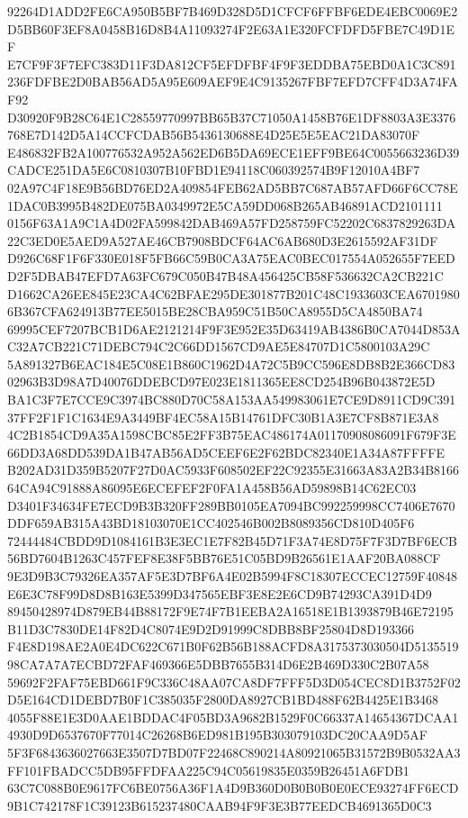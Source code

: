 \documentclass[UTF8,fontset=fandol,zihao=-4,a4paper]{ctexart}
\begin{document}
{{92264D1ADD2FE6CA950B5BF7B469D328D5D1CFCF6FFBF6EDE4EBC0069E2D5BB60F3EF8A0458B16D8B4A11093274F2E63A1E320FCFDFD5FBE7C49D1EF
E7CF9F3F7EFC383D11F3DA812CF5EFDFBF4F9F3EDDBA75EBD0A1C3C891236FDFBE2D0BAB56AD5A95E609AEF9E4C9135267FBF7EFD7CFF4D3A74FAF92
D30920F9B28C64E1C28559770997BB65B37C71050A1458B76E1DF8803A3E3376768E7D142D5A14CCFCDAB56B5436130688E4D25E5E5EAC21DA83070F
E486832FB2A100776532A952A562ED6B5DA69ECE1EFF9BE64C0055663236D39CADCE251DA5E6C0810307B10FBD1E94118C060392574B9F12010A4BF7
02A97C4F18E9B56BD76ED2A409854FEB62AD5BB7C687AB57AFD66F6CC78E1DAC0B3995B482DE075BA0349972E5CA59DD068B265AB46891ACD2101111
0156F63A1A9C1A4D02FA599842DAB469A57FD258759FC52202C6837829263DA22C3ED0E5AED9A527AE46CB7908BDCF64AC6AB680D3E2615592AF31DF
D926C68F1F6F330E018F5FB66C59B0CA3A75EAC0BEC017554A052655F7EEDD2F5DBAB47EFD7A63FC679C050B47B48A456425CB58F536632CA2CB221C
D1662CA26EE845E23CA4C62BFAE295DE301877B201C48C1933603CEA67019806B367CFA624913B77EE5015BE28CBA959C51B50CA8955D5CA4850BA74
69995CEF7207BCB1D6AE2121214F9F3E952E35D63419AB4386B0CA7044D853AC32A7CB221C71DEBC794C2C66DD1567CD9AE5E84707D1C5800103A29C
5A891327B6EAC184E5C08E1B860C1962D4A72C5B9CC596E8DB8B2E366CD8302963B3D98A7D40076DDEBCD97E023E1811365EE8CD254B96B043872E5D
BA1C3F7E7CCE9C3974BC880D70C58A153AA549983061E7CE9D8911CD9C39137FF2F1F1C1634E9A3449BF4EC58A15B14761DFC30B1A3E7CF8B871E3A8
4C2B1854CD9A35A1598CBC85E2FF3B75EAC486174A01170908086091F679F3E66DD3A68DD539DA1B47AB56AD5CEEF6E2F62BDC82340E1A34A87FFFFE
B202AD31D359B5207F27D0AC5933F608502EF22C92355E31663A83A2B34B816664CA94C91888A86095E6ECEFEF2F0FA1A458B56AD59898B14C62EC03
D3401F34634FE7ECD9B3B320FF289BB0105EA7094BC992259998CC7406E7670DDF659AB315A43BD18103070E1CC402546B002B8089356CD810D405F6
72444484CBDD9D1084161B3E3EC1E7F82B45D71F3A74E8D75F7F3D7BF6ECB56BD7604B1263C457FEF8E38F5BB76E51C05BD9B26561E1AAF20BA088CF
9E3D9B3C79326EA357AF5E3D7BF6A4E02B5994F8C18307ECCEC12759F40848E6E3C78F99D8D8B163E5399D347565EBF3E8E2E6CD9B74293CA391D4D9
89450428974D879EB44B88172F9E74F7B1EEBA2A16518E1B1393879B46E72195B11D3C7830DE14F82D4C8074E9D2D91999C8DBB8BF25804D8D193366
F4E8D198AE2A0E4DC622C671B0F62B56B188ACFD8A3175373030504D513551998CA7A7A7ECBD72FAF469366E5DBB7655B314D6E2B469D330C2B07A58
59692F2FAF75EBD661F9C336C48AA07CA8DF7FFF5D3D054CEC8D1B3752F02D5E164CD1DEBD7B0F1C385035F2800DA8927CB1BD488F62B4425E1B3468
4055F88E1E3D0AAE1BDDAC4F05BD3A9682B1529F0C66337A14654367DCAA14930D9D6537670F77014C26268B6ED981B195B303079103DC20CAA9D5AF
5F3F6843636027663E3507D7BD07F22468C890214A80921065B31572B9B0532AA3FF101FBADCC5DB95FFDFAA225C94C05619835E0359B26451A6FDB1
63C7C088B0E9617FC6BE0756A36F1A4D9B360D0B0B0B0E0ECE93274FF6ECD9B1C742178F1C39123B615237480CAAB94F9F3E3B77EEDCB4691365D0C3
}}
\end{document}
